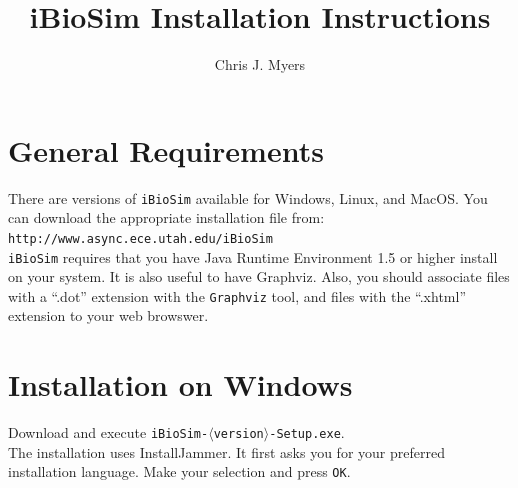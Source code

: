 \documentclass[titlepage,11pt]{article}
\title{iBioSim Installation Instructions}
\author{Chris J. Myers}
\begin{document}
\maketitle

  
\tableofcontents

\clearpage
  

\section{General Requirements}

\noindent
There are versions of {\tt iBioSim} available for Windows, Linux, and
MacOS.  You can download the appropriate installation file from:\\
{\tt http://www.async.ece.utah.edu/iBioSim}
\\ {\tt iBioSim} requires that you have 
Java Runtime Environment 1.5
or higher install on your system.  It is also useful to have 
Graphviz.
Also, you should associate files with a ``.dot'' extension with the 
{\tt Graphviz} tool, and files with the ``.xhtml'' extension to your
web browswer.

\section{Installation on Windows}

\noindent
Download and execute {\tt iBioSim-$\langle$version$\rangle$-Setup.exe}.\\
The installation uses InstallJammer.  It first asks you for your
preferred installation language.  Make your selection and press {\tt OK}.
\end{document}
